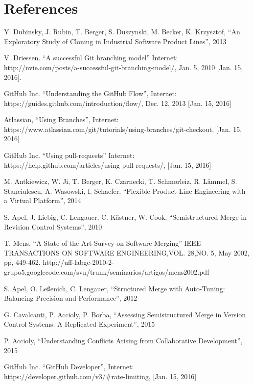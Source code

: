 \chapter{References}
\begin{thebibliography}{69}
 Y. Dubinsky, J. Rubin, T. Berger, S. Duszynski, M. Becker, K. Krzysztof, “An Exploratory Study of Cloning in Industrial Software Product Lines”, 2013

 V. Driessen. “A successful Git branching model” Internet: http://nvie.com/posts/a-successful-git-branching-model/, Jan. 5, 2010 [Jan. 15, 2016].

 GitHub Inc. “Understanding the GitHub Flow”, Internet: https://guides.github.com/introduction/flow/, Dec. 12, 2013 [Jan. 15, 2016]

 Atlassian, “Using Branches”, Internet: https://www.atlassian.com/git/tutorials/using-branches/git-checkout, [Jan. 15, 2016]

 GitHub Inc. “Using pull-requests” Internet: https://help.github.com/articles/using-pull-requests/, [Jan. 15, 2016]

 M. Antkiewicz, W. Ji, T. Berger, K. Czarnecki, T. Schmorleiz, R. Lämmel, S. Stanciulescu, A. Wasowski, I. Schaefer, “Flexible Product Line Engineering with a Virtual Platform”, 2014

 S. Apel, J. Liebig, C. Lengauer, C. Kästner, W. Cook, “Semistructured Merge in Revision Control Systems”, 2010

 T. Mens. “A State-of-the-Art Survey on Software Merging” IEEE TRANSACTIONS ON SOFTWARE ENGINEERING,VOL. 28,NO. 5, May 2002, pp, 449-462.
http://uff-labgc-2010-2-grupo5.googlecode.com/svn/trunk/seminarios/artigos/mens2002.pdf

 S. Apel, O. Leßenich, C. Lengauer, “Structured Merge with Auto-Tuning: Balancing Precision and Performance”, 2012

 G. Cavalcanti, P. Accioly, P. Borba, “Assessing Semistructured Merge in Version Control Systems: A Replicated Experiment”, 2015

 P. Accioly, “Understanding Conflicts Arising from Collaborative Development”, 2015

 GitHub Inc. “GitHub Developer”, Internet: https://developer.github.com/v3/\#rate-limiting, [Jan. 15, 2016]
\end{thebibliography}
